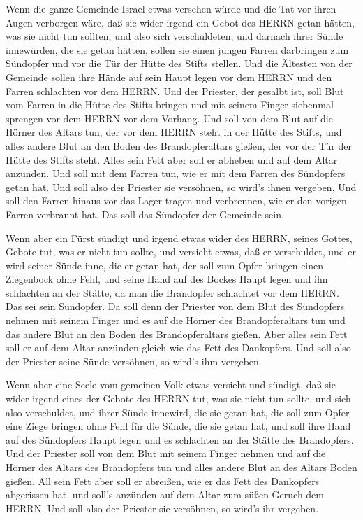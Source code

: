  Wenn die ganze Gemeinde Israel etwas versehen würde und
die Tat vor ihren Augen verborgen wäre, daß sie wider irgend ein Gebot
des HERRN getan hätten, was sie nicht tun sollten, und also sich
verschuldeten,  und darnach ihrer Sünde innewürden, die sie
getan hätten, sollen sie einen jungen Farren darbringen zum Sündopfer
und vor die Tür der Hütte des Stifts stellen.  Und die
Ältesten von der Gemeinde sollen ihre Hände auf sein Haupt legen vor dem
HERRN und den Farren schlachten vor dem HERRN.  Und der
Priester, der gesalbt ist, soll Blut vom Farren in die Hütte des Stifts
bringen  und mit seinem Finger siebenmal sprengen vor dem
HERRN vor dem Vorhang.  Und soll von dem Blut auf die
Hörner des Altars tun, der vor dem HERRN steht in der Hütte des Stifts,
und alles andere Blut an den Boden des Brandopferaltars gießen, der vor
der Tür der Hütte des Stifts steht.  Alles sein Fett aber
soll er abheben und auf dem Altar anzünden.  Und soll mit
dem Farren tun, wie er mit dem Farren des Sündopfers getan hat. Und soll
also der Priester sie versöhnen, so wird's ihnen vergeben. 
Und soll den Farren hinaus vor das Lager tragen und verbrennen, wie er
den vorigen Farren verbrannt hat. Das soll das Sündopfer der Gemeinde
sein.

 Wenn aber ein Fürst sündigt und irgend etwas wider des
HERRN, seines Gottes, Gebote tut, was er nicht tun sollte, und versieht
etwas, daß er verschuldet,  und er wird seiner Sünde inne,
die er getan hat, der soll zum Opfer bringen einen Ziegenbock ohne Fehl,
 und seine Hand auf des Bockes Haupt legen und ihn
schlachten an der Stätte, da man die Brandopfer schlachtet vor dem
HERRN. Das sei sein Sündopfer.  Da soll denn der Priester
von dem Blut des Sündopfers nehmen mit seinem Finger und es auf die
Hörner des Brandopferaltars tun und das andere Blut an den Boden des
Brandopferaltars gießen.  Aber alles sein Fett soll er auf
dem Altar anzünden gleich wie das Fett des Dankopfers. Und soll also der
Priester seine Sünde versöhnen, so wird's ihm vergeben.

 Wenn aber eine Seele vom gemeinen Volk etwas versieht und
sündigt, daß sie wider irgend eines der Gebote des HERRN tut, was sie
nicht tun sollte, und sich also verschuldet,  und ihrer
Sünde innewird, die sie getan hat, die soll zum Opfer eine Ziege bringen
ohne Fehl für die Sünde, die sie getan hat,  und soll ihre
Hand auf des Sündopfers Haupt legen und es schlachten an der Stätte des
Brandopfers.  Und der Priester soll von dem Blut mit seinem
Finger nehmen und auf die Hörner des Altars des Brandopfers tun und
alles andere Blut an des Altars Boden gießen.  All sein
Fett aber soll er abreißen, wie er das Fett des Dankopfers abgerissen
hat, und soll's anzünden auf dem Altar zum süßen Geruch dem HERRN. Und
soll also der Priester sie versöhnen, so wird's ihr vergeben.

